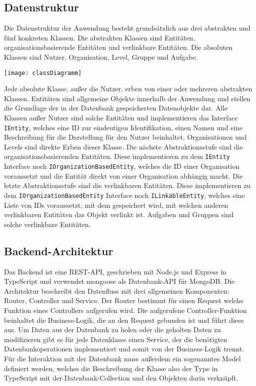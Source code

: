 \subsection{Datenstruktur}
Die Datenstruktur der Anwendung besteht grundsätzlich aus drei abstrakten und fünf konkreten Klassen. Die abstrakten Klassen sind Entitäten, organisationsbasierende Entitäten und verlinkbare Entitäten. Die absoluten Klassen sind Nutzer, Organisation, Level, Gruppe und Aufgabe.

\vspace{20pt}
\begin{center}
    \begin{minipage}{1\linewidth}
        \texttt{[image: classDiagramm]}
    \end{minipage}
\end{center}
\vspace{20pt}

Jede absolute Klasse, außer die Nutzer, erben von einer oder mehreren abstrakten Klassen. Entitäten sind allgemeine Objekte innerhalb der Anwendung und stellen die Grundlage der in der Datenbank gespeicherten Datenobjekte dar. Alle Klassen außer Nutzer sind solche Entitäten und implementieren das Interface \verb|IEntity|, welches eine ID zur eindeutigen Identifikation, einen Namen und eine Beschreibung für die Darstellung für den Nutzer beinhaltet. Organisationen und Levels sind direkte Erben dieser Klasse. Die nächste Abstraktionsstufe sind die organisationsbasierenden Entitäten. Diese implementieren zu dem \verb|IEntity| Interface noch \verb|IOrganizationBasedEntity|, welches die ID einer Organisation voraussetzt und die Entität direkt von einer Organisation abhängig macht. Die letzte Abstraktionsstufe sind die verlinkbaren Entitäten. Diese implementieren zu dem \verb|IOrganizationBasedEntity| Interface noch \verb|ILinkableEntity|, welches eine Liste von IDs voraussetzt, mit dem gespeichert wird, mit welchen anderen verlinkbaren Entitäten das Objekt verlinkt ist. Aufgaben und Gruppen sind solche verlinkbare Entitäten.

\subsection{Backend-Architektur}
Das Backend ist eine REST-API, geschrieben mit Node.js und Express in TypeScript und verwendet mongoose als Datenbank-API für MongoDB. Die Architektur beschreibt den Datenfluss mit drei allgemeinen Komponenten: Router, Controller und Service.
Der Router bestimmt für einen Request welche Funktion eines Controllers aufgerufen wird. Die aufgerufene Controller-Funktion beinhaltet die Business-Logik, die an den Request gebunden ist und führt diese aus. Um Daten aus der Datenbank zu holen oder die geholten Daten zu modifizieren gibt es für jede Datenklasse einen Service, der die benötigten Datenbankoperationen implementiert und somit von der Business-Logik trennt. Für die Interaktion mit der Datenbank muss außerdem ein sogenanntes Model definiert werden, welches die Beschreibung der Klasse also der Type in TypeScript mit der Datenbank-Collection und den Objekten darin verknüpft.

